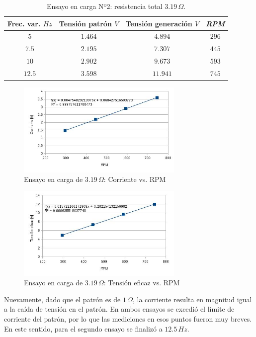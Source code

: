 \documentclass[a4paper,11pt,twoside]{IT-CNEA}
\begin{document}
\begin{table}[h!]
\centering
\caption{Ensayo en carga Nº2: resistencia total $3.19\,\varOmega$.}
\label{tabla:carga319}
\begin{tabular}{|c|c|c|c|}
\hline
Frec. var. $Hz$ & Tensión patrón $V$ & Tensión generación $V$  & \textit{RPM}\\ \hline

$5$&$1.464$&$4.894$&$296$ \\ \hline
$7.5$&$2.195$&$7.307$&$445$ \\ \hline
$10$&$2.902$&$9.673$&$593$ \\ \hline
$12.5$&$3.598$&$11.941$&$745$ \\ \hline

\end{tabular}
\end{table}
\begin{figure}[h!]
\centering
\includegraphics[width=8cm]{Figuras/CargaCorriente319.jpg}
\caption{Ensayo en carga de $3.19\,\varOmega$: Corriente vs. RPM}
\label{fig:CargaCorriente319}
\end{figure}
\begin{figure}[h!]
\centering
\includegraphics[width=8cm]{Figuras/CargaTension319.jpg}
\caption{Ensayo en carga de $3.19\,\varOmega$: Tensión eficaz vs. RPM}
\label{fig:CargaTension319}
\end{figure}
\par Nuevamente, dado que el patrón es de $1\,\varOmega$, la corriente resulta en magnitud igual a la caída de tensión en el patrón. En ambos ensayos se excedió el límite de corriente del patrón, por lo que las mediciones en esos puntos fueron muy breves. En este sentido, para el segundo ensayo se finalizó a $12.5\,Hz$.
\end{document}
